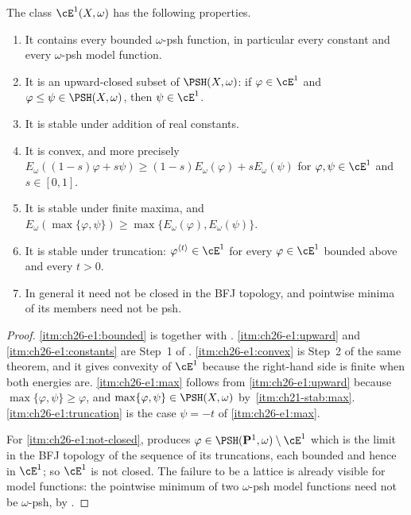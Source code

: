 \begin{theorem}
\label{thm:ch26-e1-structure}
The class $\cE^1(X,\omega)$ has the following properties.
\begin{enumerate}
\item\label{itm:ch26-e1:bounded}
 It contains every bounded $\omega$-psh function, in particular every
 constant and every $\omega$-psh model function.
\item\label{itm:ch26-e1:upward}
 It is an upward-closed subset of $\PSH(X,\omega)$: if
 $\varphi\in\cE^1$ and $\varphi\leq\psi\in\PSH(X,\omega)$, then
 $\psi\in\cE^1$.
\item\label{itm:ch26-e1:constants}
 It is stable under addition of real constants.
\item\label{itm:ch26-e1:convex}
 It is convex, and more precisely
 $E_\omega((1-s)\varphi+s\psi)\geq(1-s)E_\omega(\varphi)+sE_\omega(\psi)$
 for $\varphi,\psi\in\cE^1$ and $s\in[0,1]$.
\item\label{itm:ch26-e1:max}
 It is stable under finite maxima, and
 $E_\omega(\max\{\varphi,\psi\})\geq\max\{E_\omega(\varphi),E_\omega(\psi)\}$.
\item\label{itm:ch26-e1:truncation}
 It is stable under truncation: $\varphi^{\langle t\rangle}\in\cE^1$ for
 every $\varphi\in\cE^1$ bounded above and every $t>0$.
\item\label{itm:ch26-e1:not-closed}
 In general it need not be closed in the BFJ topology, and pointwise
 minima of its members need not be psh.
\end{enumerate}
\end{theorem}

\begin{proof}
\cref{itm:ch26-e1:bounded} is  together with
.  \cref{itm:ch26-e1:upward} and
\cref{itm:ch26-e1:constants} are Step~1 of
.  \cref{itm:ch26-e1:convex} is Step~2 of the
same theorem, and it gives convexity of $\cE^1$ because the right-hand side
is finite when both energies are.  \cref{itm:ch26-e1:max} follows from
\cref{itm:ch26-e1:upward} because $\max\{\varphi,\psi\}\geq\varphi$, and
$\max\{\varphi,\psi\}\in\PSH(X,\omega)$ by
\,\cref{itm:ch21-stab:max}.  \cref{itm:ch26-e1:truncation}
is the case $\psi=-t$ of \cref{itm:ch26-e1:max}.

For \cref{itm:ch26-e1:not-closed},  produces
$\varphi\in\PSH(\mathbf P^1,\omega)\setminus\cE^1$ which is the limit in
the BFJ topology of the sequence of its truncations, each bounded and hence
in $\cE^1$; so $\cE^1$ is not closed.  The failure to be a lattice is
already visible for model functions: the pointwise minimum of two
$\omega$-psh model functions need not be $\omega$-psh, by
.
\end{proof}

